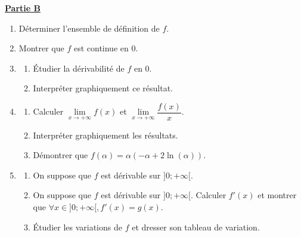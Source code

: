 \documentclass[12pt,a4paper]{article}
\begin{document}
\noindent \underline{\textbf{Partie B}}
\begin{enumerate}
    \item Déterminer l'ensemble de définition de $f$.
    \item Montrer que $f$ est continue en 0.
    \item \begin{enumerate}
        \item Étudier la dérivabilité de $f$ en 0.
        \item Interpréter graphiquement ce résultat.
    \end{enumerate}
    \item \begin{enumerate}
        \item Calculer $\lim\limits_{x \to +\infty} f(x)$ et $\lim\limits_{x \to +\infty} \dfrac{f(x)}{x}$.
        \item Interpréter graphiquement les résultats.
        \item Démontrer que $f(\alpha) = \alpha(-\alpha + 2\ln(\alpha))$.
    \end{enumerate}
    \item \begin{enumerate}
        \item On suppose que $f$ est dérivable sur $]0; +\infty[$.
        \item On suppose que $f$ est dérivable sur $]0; +\infty[$. Calculer $f'(x)$ et montrer que $\forall x \in ]0; +\infty[, f'(x) = g(x)$.
        \item Étudier les variations de $f$ et dresser son tableau de variation.
    \end{enumerate}
\end{enumerate}

\vspace{0.3cm}
\end{document}
